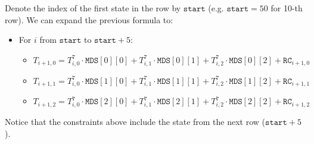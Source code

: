 Denote the index of the first state in the row by $\texttt{start}$ (e.g. $\texttt{start}=50$ for 10-th row).
We can expand the previous formula to:
\begin{itemize}
    \item For $i$ from $\texttt{start}$ to $\texttt{start} + 5$:
    \begin{itemize}
        \item $T_{i + 1, 0} = T_{i, 0}^7 \cdot \texttt{MDS}[0][0] + T_{i, 1}^7 \cdot
        \texttt{MDS}[0][1] + T_{i, 2}^7 \cdot \texttt{MDS}[0][2] + \texttt{RC}_{i + 1, 0}$
        \item $T_{i + 1, 1} = T_{i, 0}^7 \cdot \texttt{MDS}[1][0] + T_{i, 1}^7 \cdot
        \texttt{MDS}[1][1] + T_{i, 2}^7 \cdot \texttt{MDS}[1][2] + \texttt{RC}_{i + 1, 1}$
        \item $T_{i + 1, 2} = T_{i, 0}^7 \cdot \texttt{MDS}[2][0] + T_{i, 1}^7 \cdot
        \texttt{MDS}[2][1] + T_{i, 2}^7 \cdot \texttt{MDS}[2][2] + \texttt{RC}_{i + 1, 2}$
    \end{itemize}
\end{itemize}

Notice that the constraints above include the state from the next row ($\texttt{start} + 5$).